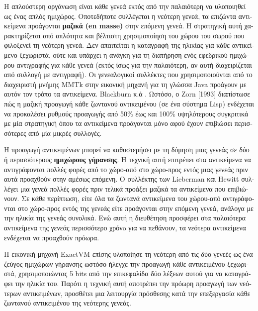\begin{greek}
Η απλούστερη οργάνωση είναι κάθε γενεά εκτός από την παλαιότερη να υλοποιηθεί ως
ένας απλός ημιχώρος. Οποτεδήποτε συλλέγεται η νεότερη γενεά, τα επιζώντα αντικείμενα
προάγονται \textbf{μαζικά (en masse)} στην επόμενη γενεά. Η στρατηγική αυτή χαρακτηρίζεται
από απλότητα και βέλτιστη χρησιμοποίηση του χώρου του σωρού που φιλοξενεί τη νεότερη
γενεά. Δεν απαιτείται η καταγραφή της ηλικίας για κάθε αντικείμενο ξεχωριστά, ούτε και
υπάρχει η ανάγκη για τη διατήρηση ενός εφεδρικού ημιχώρου αντιγραφής για κάθε γενεά
(εκτός ίσως για την παλαιότερη, αν αυτή διαχειρίζεται από συλλογή με αντιγραφή). Οι
γενεαλογικοί συλλέκτες που χρησιμοποιούνται από το διαχειριστή μνήμης MMTk στην
εικονική μηχανή για τη γλώσσα Java προάγουν με αυτόν τον τρόπο τα αντικείμενα.
Blackburn κ.ά \cite{DBLP:conf/iwmm/BlackburnH04}. Ωστόσο, ο Zorn [1993] διαπίστωσε πώς η μαζική προαγωγή κάθε
ζωντανού αντικειμένου (σε ένα σύστημα Lisp) ενδέχεται να προκαλέσει ρυθμούς
προαγωγής από 50\% έως και 100\% υψηλότερους συγκριτικά με μία στρατηγική όπου
τα αντικείμενα προάγονται μόνο αφού έχουν επιβιώσει περισσότερες από μία μικρές
συλλογές.

Η προαγωγή αντικειμένων μπορεί να καθυστερήσει με τη δόμηση
μιας γενεάς σε δύο ή περισσότερους \textbf{ημιχώρους γήρανσης}.
Η τεχνική αυτή επιτρέπει στα αντικείμενα να αντιγράφονται
πολλές φορές από το χώρο-από στο χώρο-προς εντός μιας γενεάς
πριν αυτά προαχθούν στην αμέσως επόμενη. Ο συλλέκτης των Lieberman
και Hewitt \cite{DBLP:journals/cacm/LiebermanH83} συλλέγει μια
γενεά πολλές φορές πριν τελικά προάξει μαζικά τα αντικείμενα
που επιβιώνουν. Σε κάθε περίπτωση, είτε όλα τα ζωντανά αντικείμενα
του χώρου-από αντιγράφονται στο χώρο-προς εντός της γενεάς είτε
προάγονται στην επόμενη γενεά, ανάλογα με την ηλικία της γενεάς
συνολικά. Ενώ αυτή η διευθέτηση προσφέρει στα παλαιότερα αντικείμενα
της γενεάς περισσότερο χρόνo για να πεθάνουν, τα νεότερα αντικείμενα
ενδέχεται να προαχθούν πρόωρα.

Η εικονική μηχανή ExactVM επίσης υλοποίησε τη νεότερη από τις
δύο γενεές ως ένα ζεύγος ημιχώρων γήρανσης ωστόσο ήλεγχε την
προαγωγή κάθε αντικειμένου ξεχωριστά, χρησιμοποιώντας 5 bits
από την επικεφαλίδα δύο λέξεων αυτού για να καταγράφει την
ηλικία του. Παρότι η τεχνική αυτή αποτρέπει την πρόωρη προαγωγή
των νεότερων αντικειμένων, προσθέτει μια λειτουργία πρόσθεσης
κατά την επεξεργασία κάθε ζωντανού αντικειμένου της νεότερης
γενεάς.


\end{greek}
